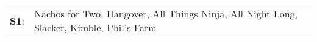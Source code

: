 \begin{supertabular}{p{0.03\textwidth}p{0.92\textwidth}}
 \textbf{S1}:  &  Nachos for Two\textsuperscript{}, \enspace Hangover\textsuperscript{}, \enspace All Things Ninja\textsuperscript{}, \enspace All Night Long\textsuperscript{}, \enspace Slacker\textsuperscript{}, \enspace Kimble\textsuperscript{}, \enspace Phil's Farm\textsuperscript{}  \enspace  \\
\end{supertabular}
